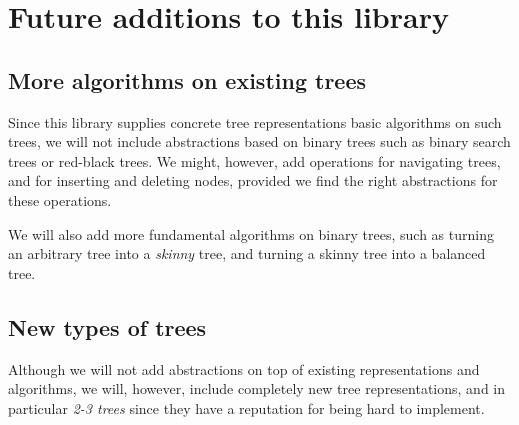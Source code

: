 \chapter{Future additions to this library}
\label{chap-future}

\section{More algorithms on existing trees}

Since this library supplies concrete tree representations basic
algorithms on such trees, we will not include abstractions based on
binary trees such as binary search trees or red-black trees.  We
might, however, add operations for navigating trees, and for inserting
and deleting nodes, provided we find the right abstractions for these
operations.

We will also add more fundamental algorithms on binary trees, such as
turning an arbitrary tree into a \emph{skinny} tree, and turning a
skinny tree into a balanced tree.

\section{New types of trees}

Although we will not add abstractions on top of existing
representations and algorithms, we will, however, include completely
new tree representations, and in particular \emph{2-3 trees}
\cite{Aho:1974:DAC:578775} since they have a reputation for being hard
to implement.
